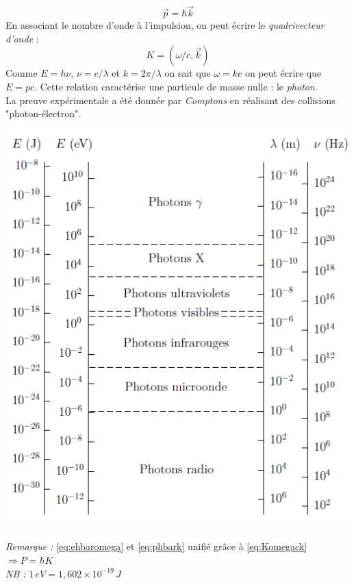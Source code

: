 \documentclass[british,french,11pt, a4paper, openany]{book}
\begin{document}
	\begin{equation}\label{eq:phbark}
		\vec{p} = \hbar \vec{k}
	\end{equation}
	En associant le nombre d'onde à l'impulsion, on peut écrire le \textit{quadrivecteur d'onde} :
	\begin{equation}\label{eq:Komegack}
		K = (\omega / c, \vec{k})
	\end{equation}
	Comme $E = h\nu$, $\nu = c/\lambda$ et $k = 2\pi/\lambda$ on sait que $\omega = kc$ on peut écrire que $E = pc$. Cette relation caractérise une particule de masse nulle : le \textit{photon}.\ \\
	La preuve expérimentale a été donnée par \textit{Comptons} en réalisant des collisions "photon-électron".\\
	
	\begin{center}
		\includegraphics[scale = 0.5]{img/tableaucoeur}
	\end{center}
	\textit{Remarque :} \eqref{eq:ehbaromega} et \eqref{eq:phbark} unifié grâce à \eqref{eq:Komegack}$\Rightarrow P=\hbar K$\\
	\textit{NB :} $1\,eV=1,602\times 10^{-19}\,J$
\end{document}
